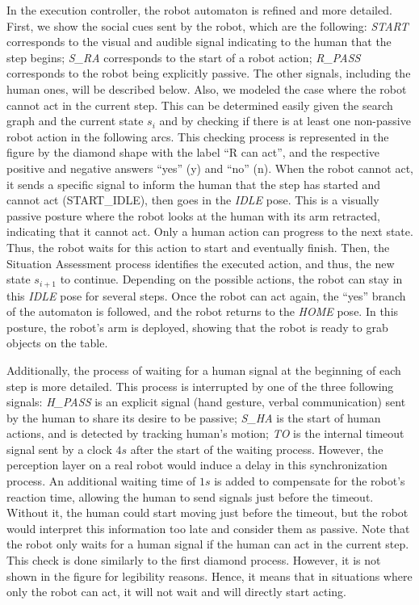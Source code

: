 In the execution controller, the robot automaton is refined and more detailed. 
First, we show the social cues sent by the robot, which are the following: \textit{START} corresponds to the visual and audible signal indicating to the human that the step begins; \textit{S\_RA} corresponds to the start of a robot action; \textit{R\_PASS} corresponds to the robot being explicitly passive. The other signals, including the human ones, will be described below.
Also, we modeled the case where the robot cannot act in the current step. This can be determined easily given the search graph and the current state $s_i$ and by checking if there is at least one non-passive robot action in the following arcs. This checking process is represented in the figure by the diamond shape with the label ``R can act'', and the respective positive and negative answers ``yes'' (y) and ``no'' (n). When the robot cannot act, it sends a specific signal to inform the human that the step has started and cannot act (START\_IDLE), then goes in the \textit{IDLE} pose. This is a visually passive posture where the robot looks at the human with its arm retracted, indicating that it cannot act. Only a human action can progress to the next state. Thus, the robot waits for this action to start and eventually finish. Then, the Situation Assessment process identifies the executed action, and thus, the new state $s_{i+1}$ to continue. Depending on the possible actions, the robot can stay in this \textit{IDLE} pose for several steps. Once the robot can act again, the ``yes'' branch of the automaton is followed, and the robot returns to the \textit{HOME} pose. In this posture, the robot's arm is deployed, showing that the robot is ready to grab objects on the table.

Additionally, the process of waiting for a human signal at the beginning of each step is more detailed. This process is interrupted by one of the three following signals: \textit{H\_PASS} is an explicit signal (hand gesture, verbal communication) sent by the human to share its desire to be passive; \textit{S\_HA} is the start of human actions, and is detected by tracking human's motion; \textit{TO} is the internal timeout signal sent by a clock $4s$ after the start of the waiting process. 
However, the perception layer on a real robot would induce a delay in this synchronization process. 
An additional waiting time of $1s$ is added to compensate for the robot's reaction time, allowing the human to send signals just before the timeout. Without it, the human could start moving just before the timeout, but the robot would interpret this information too late and consider them as passive.
Note that the robot only waits for a human signal if the human can act in the current step. This check is done similarly to the first diamond process. However, it is not shown in the figure for legibility reasons. Hence, it means that in situations where only the robot can act, it will not wait and will directly start acting.

